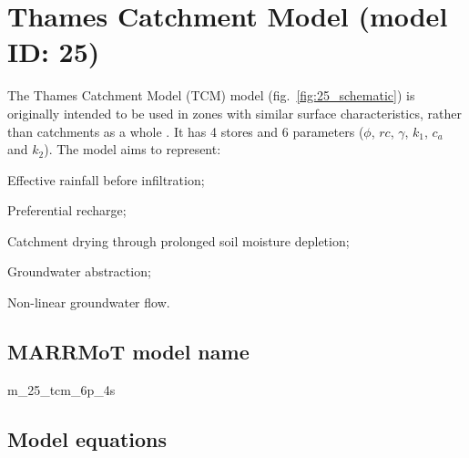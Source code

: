 \section{Thames Catchment Model (model ID: 25)}
The Thames Catchment Model (TCM) model (fig.~\ref{fig:25_schematic}) is originally intended to be used in zones with similar surface characteristics, rather than catchments as a whole \citep{Moore2001}. It has 4 stores and 6 parameters ($\phi$, $rc$, $\gamma$, $k_1$, $c_a$ and $k_2$). The model aims to represent:

\begin{itemizecompact}
\item Effective rainfall before infiltration;
\item Preferential recharge;
\item Catchment drying through prolonged soil moisture depletion;
\item Groundwater abstraction;
\item Non-linear groundwater flow.
\end{itemizecompact}

\subsection{MARRMoT model name}
m\_25\_tcm\_6p\_4s \\

\subsection{Model equations}

